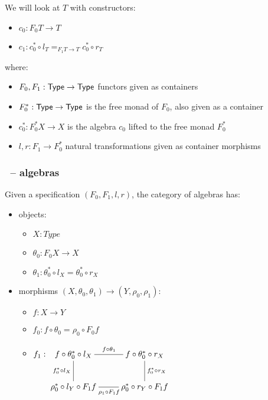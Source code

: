 \documentclass{beamer}
\begin{document}
\begin{frame}[noframenumbering]
  \frametitle{\onehits}
   
   We will look at \onehits $T$ with constructors:
   
   \begin{itemize}
   \item $c_0 : F_0 T \to T$
   \item $c_1 : c_0^* \circ l_T =_{F_1 T \to T} c_0^* \circ r_T$
   \end{itemize}

   where:

   \begin{itemize}
  \item $F_0, F_1 : \mathsf{Type} \to \mathsf{Type}$ functors given as containers
  \item $F_0^* : \mathsf{Type} \to \mathsf{Type}$ is the free monad of $F_0$, also given as a container
  \item $c_0^* : F_0^* X \to X$ is the algebra $c_0$ lifted to the free monad $F_0^*$
  \item $l, r : F_1 \to F_0^*$ natural transformations given as container morphisms
   \end{itemize}

 \end{frame}

 \begin{frame}
   \frametitle{\onehits\ -- algebras}
   
   Given a specification $(F_0,F_1, l, r)$, the category of algebras has:

   \begin{itemize}
   \item objects:
     \begin{itemize}
     \item $X : Type$
     \item $\theta_0 : F_0 X \to X$
     \item $\theta_1 : \theta_0^* \circ l_X = \theta_0^* \circ r_X$
     \end{itemize}
   \item morphisms $(X,\theta_0,\theta_1) \to (Y,\rho_0,\rho_1)$:
     \begin{itemize}
     \item $f : X \to Y$ 
     \item $f_0 : f \circ \theta_0 = \rho_0 \circ F_0 f$
     \item $f_1 : \xymatrix{ f \circ \theta_0^* \circ l_X \ar@{-}[r]^{f
           \circ \theta_1} \ar@{-}[d]_{f_0^* \circ l_X} &f \circ
         \theta_0^* \circ r_X \ar@{-}[d]^{f_0^* \circ r_X}
         \\
         \rho_0^* \circ l_Y \circ F_1 f \ar@{-}[r]_{\rho_1 \circ F_1 f} &\rho_0^* \circ r_Y
         \circ F_1 f }$
     \end{itemize}
   \end{itemize}
 \end{frame}
\end{document}
